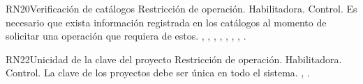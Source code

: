 
\begin{BussinesRule}{RN20}{Verificación de catálogos} 
	\BRitem[Tipo:] Restricción de operación. 
	\BRitem[Clase:] Habilitadora. 
	\BRitem[Nivel:] Control. %
	\BRitem[Descripción:] Es necesario que exista información registrada en los catálogos al momento de solicitar una operación que requiera de estos.
	 , , , , , , , . 
\end{BussinesRule}



\begin{BussinesRule}{RN22}{Unicidad de la clave del proyecto} 
	\BRitem[Tipo:] Restricción de operación. 
	\BRitem[Clase:] Habilitadora. 
	\BRitem[Nivel:] Control. %
	\BRitem[Descripción:] La clave de los proyectos debe ser única en todo el sistema.
	 , . 
\end{BussinesRule}

